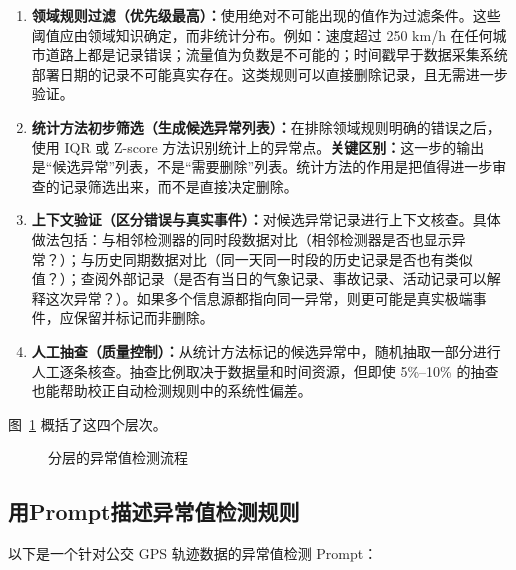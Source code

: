 \begin{enumerate}
  \item \textbf{领域规则过滤（优先级最高）：}使用绝对不可能出现的值作为过滤条件。这些阈值应由领域知识确定，而非统计分布。例如：速度超过 250 km/h 在任何城市道路上都是记录错误；流量值为负数是不可能的；时间戳早于数据采集系统部署日期的记录不可能真实存在。这类规则可以直接删除记录，且无需进一步验证。
  \item \textbf{统计方法初步筛选（生成候选异常列表）：}在排除领域规则明确的错误之后，使用 IQR 或 Z-score 方法识别统计上的异常点。\textbf{关键区别：}这一步的输出是“候选异常”列表，不是“需要删除”列表。统计方法的作用是把值得进一步审查的记录筛选出来，而不是直接决定删除。
  \item \textbf{上下文验证（区分错误与真实事件）：}对候选异常记录进行上下文核查。具体做法包括：与相邻检测器的同时段数据对比（相邻检测器是否也显示异常？）；与历史同期数据对比（同一天同一时段的历史记录是否也有类似值？）；查阅外部记录（是否有当日的气象记录、事故记录、活动记录可以解释这次异常？）。如果多个信息源都指向同一异常，则更可能是真实极端事件，应保留并标记而非删除。
  \item \textbf{人工抽查（质量控制）：}从统计方法标记的候选异常中，随机抽取一部分进行人工逐条核查。抽查比例取决于数据量和时间资源，但即使 5\%--10\% 的抽查也能帮助校正自动检测规则中的系统性偏差。
\end{enumerate}

图~\ref{fig:ch05_layers} 概括了这四个层次。

\begin{figure}[H]
  \centering
  \caption{分层的异常值检测流程}
  \label{fig:ch05_layers}
\end{figure}

\subsection{用Prompt描述异常值检测规则}

以下是一个针对公交 GPS 轨迹数据的异常值检测 Prompt：

